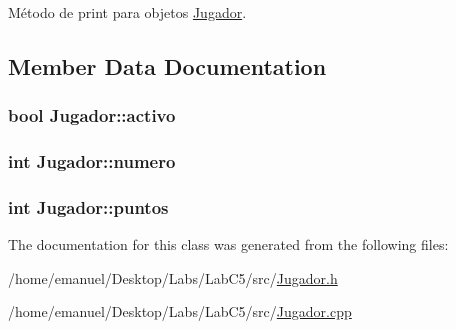 Método de print para objetos \hyperlink{class_jugador}{Jugador}. 



\subsection{Member Data Documentation}
\hypertarget{class_jugador_a71f25f6ca8126364057d932d556b533e}{
\subsubsection[{activo}]{\setlength{\rightskip}{0pt plus 5cm}bool Jugador\+::activo}}\label{class_jugador_a71f25f6ca8126364057d932d556b533e}
\hypertarget{class_jugador_a974067cd6559949ff6b186d53bf4b420}{
\subsubsection[{numero}]{\setlength{\rightskip}{0pt plus 5cm}int Jugador\+::numero}}\label{class_jugador_a974067cd6559949ff6b186d53bf4b420}
\hypertarget{class_jugador_a4e264d857d5a3f1a68cbb13e4b88930f}{
\subsubsection[{puntos}]{\setlength{\rightskip}{0pt plus 5cm}int Jugador\+::puntos}}\label{class_jugador_a4e264d857d5a3f1a68cbb13e4b88930f}


The documentation for this class was generated from the following files\+:\begin{DoxyCompactItemize}
\item 
/home/emanuel/\+Desktop/\+Labs/\+Lab\+C5/src/\hyperlink{_jugador_8h}{Jugador.\+h}\item 
/home/emanuel/\+Desktop/\+Labs/\+Lab\+C5/src/\hyperlink{_jugador_8cpp}{Jugador.\+cpp}\end{DoxyCompactItemize}
